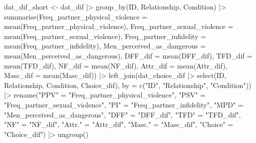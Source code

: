 \documentclass[
  bookmarksnumbered]{article}
\newenvironment{Shaded}{\begin{snugshade}}{\end{snugshade}}
\newcommand{\AttributeTok}[1]{\textcolor[rgb]{0.80,0.80,0.80}{#1}}
\newcommand{\FunctionTok}[1]{\textcolor[rgb]{0.94,0.94,0.56}{#1}}
\newcommand{\NormalTok}[1]{\textcolor[rgb]{0.80,0.80,0.80}{#1}}
\newcommand{\OtherTok}[1]{\textcolor[rgb]{0.94,0.94,0.56}{#1}}
\newcommand{\SpecialCharTok}[1]{\textcolor[rgb]{0.86,0.64,0.64}{#1}}
\newcommand{\StringTok}[1]{\textcolor[rgb]{0.80,0.58,0.58}{#1}}
\begin{document}
\begin{Shaded}
\begin{Highlighting}[]
\NormalTok{dat\_dif\_short }\OtherTok{\textless{}{-}}\NormalTok{ dat\_dif }\SpecialCharTok{|\textgreater{}} 
  \FunctionTok{group\_by}\NormalTok{(ID, Relationship, Condition) }\SpecialCharTok{|\textgreater{}} 
  \FunctionTok{summarise}\NormalTok{(}\AttributeTok{Freq\_partner\_physical\_violence =} \FunctionTok{mean}\NormalTok{(Freq\_partner\_physical\_violence),}
            \AttributeTok{Freq\_partner\_sexual\_violence =} \FunctionTok{mean}\NormalTok{(Freq\_partner\_sexual\_violence), }
            \AttributeTok{Freq\_partner\_infidelity =} \FunctionTok{mean}\NormalTok{(Freq\_partner\_infidelity),}
            \AttributeTok{Men\_perceived\_as\_dangerous =} \FunctionTok{mean}\NormalTok{(Men\_perceived\_as\_dangerous),}
            \AttributeTok{DFF\_dif =} \FunctionTok{mean}\NormalTok{(DFF\_dif),}
            \AttributeTok{TFD\_dif =} \FunctionTok{mean}\NormalTok{(TFD\_dif),}
            \AttributeTok{NF\_dif =} \FunctionTok{mean}\NormalTok{(NF\_dif),}
            \AttributeTok{Attr\_dif =} \FunctionTok{mean}\NormalTok{(Attr\_dif),}
            \AttributeTok{Masc\_dif =} \FunctionTok{mean}\NormalTok{(Masc\_dif)) }\SpecialCharTok{|\textgreater{}} 
  \FunctionTok{left\_join}\NormalTok{(dat\_choice\_dif }\SpecialCharTok{|\textgreater{}} 
              \FunctionTok{select}\NormalTok{(ID, Relationship, Condition, Choice\_dif), }
            \AttributeTok{by =} \FunctionTok{c}\NormalTok{(}\StringTok{"ID"}\NormalTok{, }\StringTok{"Relationship"}\NormalTok{, }\StringTok{"Condition"}\NormalTok{)) }\SpecialCharTok{|\textgreater{}} 
  \FunctionTok{rename}\NormalTok{(}\StringTok{"PPV"} \OtherTok{=} \StringTok{"Freq\_partner\_physical\_violence"}\NormalTok{,}
         \StringTok{"PSV"} \OtherTok{=} \StringTok{"Freq\_partner\_sexual\_violence"}\NormalTok{,      }
         \StringTok{"PI"} \OtherTok{=}  \StringTok{"Freq\_partner\_infidelity"}\NormalTok{,}
         \StringTok{"MPD"} \OtherTok{=} \StringTok{"Men\_perceived\_as\_dangerous"}\NormalTok{,}
         \StringTok{"DFF"} \OtherTok{=} \StringTok{"DFF\_dif"}\NormalTok{,}
         \StringTok{"TFD"} \OtherTok{=} \StringTok{"TFD\_dif"}\NormalTok{,}
         \StringTok{"NF"} \OtherTok{=}  \StringTok{"NF\_dif"}\NormalTok{,}
         \StringTok{"Attr."} \OtherTok{=} \StringTok{"Attr\_dif"}\NormalTok{,}
         \StringTok{"Masc."} \OtherTok{=} \StringTok{"Masc\_dif"}\NormalTok{,}
         \StringTok{"Choice"} \OtherTok{=} \StringTok{"Choice\_dif"}\NormalTok{) }\SpecialCharTok{|\textgreater{}} 
  \FunctionTok{ungroup}\NormalTok{()}
  

\end{Highlighting}
\end{Shaded}
\end{document}

